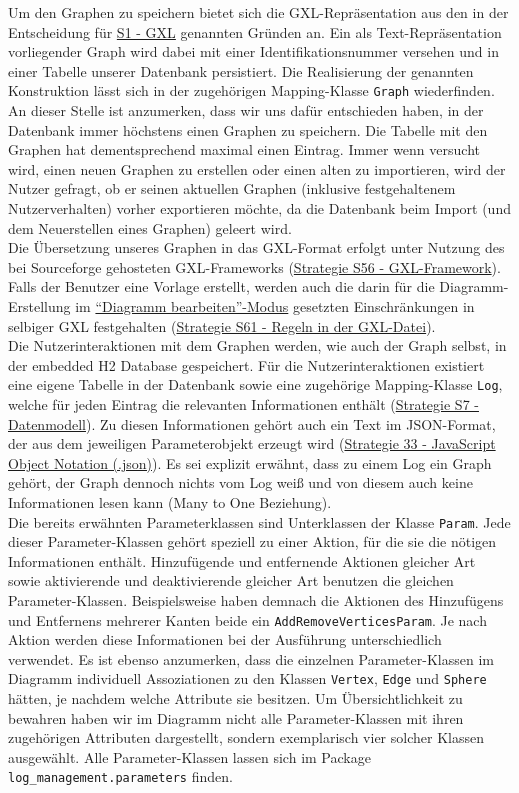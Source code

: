 \documentclass[enabledeprecatedfontcommands,fontsize=11pt,paper=a4,twoside]{scrartcl}
\newcounter{one}
\begin{document}
Um den Graphen zu speichern bietet sich die GXL-Repräsentation aus den in der Entscheidung für \hyperlink{yy}{S1 - GXL} genannten Gründen an. Ein als Text-Repräsentation vorliegender Graph wird dabei mit einer Identifikationsnummer versehen und in einer Tabelle unserer Datenbank persistiert. Die Realisierung der genannten Konstruktion lässt sich in der zugehörigen Mapping-Klasse \texttt{Graph} wiederfinden.  An dieser Stelle ist anzumerken, dass wir uns dafür entschieden haben, in der Datenbank immer höchstens einen Graphen zu speichern. Die Tabelle mit den Graphen hat dementsprechend maximal einen Eintrag. Immer wenn versucht wird, einen neuen Graphen zu erstellen oder einen alten zu importieren, wird der Nutzer gefragt, ob er seinen aktuellen Graphen (inklusive festgehaltenem Nutzerverhalten) vorher exportieren möchte, da die Datenbank beim Import (und dem Neuerstellen eines Graphen) geleert wird.\\
Die Übersetzung unseres Graphen in das GXL-Format erfolgt unter Nutzung des bei Sourceforge gehosteten GXL-Frameworks (\hyperlink{ttt}{Strategie S56 - GXL-Framework}). Falls der Benutzer eine Vorlage erstellt, werden auch die darin für die Diagramm-Erstellung im \hyperlink{``Diagramm bearbeiten''-Modus}{``Diagramm bearbeiten''-Modus} gesetzten Einschränkungen in selbiger GXL festgehalten (\hyperlink{vvv}{Strategie S61 - Regeln in der GXL-Datei}).\\ 

Die Nutzerinteraktionen mit dem Graphen werden, wie auch der Graph selbst, in der embedded H2 Database gespeichert. Für die Nutzerinteraktionen existiert eine eigene Tabelle in der Datenbank sowie eine zugehörige Mapping-Klasse \texttt{Log}, welche für jeden Eintrag die relevanten Informationen enthält (\hyperlink{aaa}{Strategie S7 - Datenmodell}). Zu diesen Informationen gehört auch ein Text im JSON-Format, der aus dem jeweiligen Parameterobjekt erzeugt wird (\hyperlink{jjj}{Strategie 33 - JavaScript Object Notation (.json)}). Es sei explizit erwähnt, dass zu einem Log ein Graph gehört, der Graph dennoch nichts vom Log weiß und von diesem auch keine Informationen lesen kann (Many to One Beziehung). \\
Die bereits erwähnten Parameterklassen sind Unterklassen der Klasse \texttt{Param}. Jede dieser Parameter-Klassen gehört speziell zu einer Aktion, für die sie die nötigen Informationen enthält. Hinzufügende und entfernende Aktionen gleicher Art sowie aktivierende und deaktivierende gleicher Art benutzen die gleichen Parameter-Klassen. Beispielsweise haben demnach die Aktionen des Hinzufügens und Entfernens mehrerer Kanten beide ein \texttt{AddRemoveVerticesParam}. Je nach Aktion werden diese Informationen bei der Ausführung unterschiedlich verwendet. Es ist ebenso anzumerken, dass die einzelnen Parameter-Klassen im Diagramm individuell Assoziationen zu den Klassen \texttt{Vertex}, \texttt{Edge} und \texttt{Sphere} hätten, je nachdem welche Attribute sie besitzen. Um Übersichtlichkeit zu bewahren haben wir im Diagramm nicht alle Parameter-Klassen mit ihren zugehörigen Attributen dargestellt, sondern exemplarisch vier solcher Klassen ausgewählt. Alle Parameter-Klassen lassen sich im Package \texttt{log\_management.parameters} finden. \\
\end{document}
